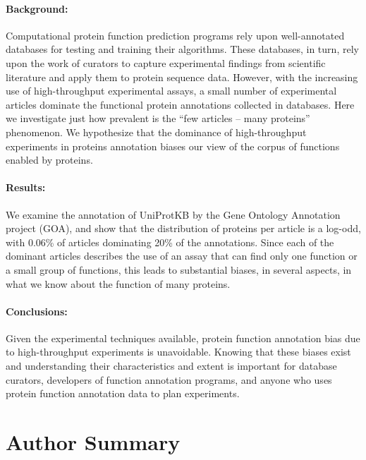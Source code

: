 \documentclass[12pt]{article}
\begin{document}
        \paragraph*{Background:} Computational protein function
prediction programs rely upon well-annotated databases for testing and training
their algorithms. These databases, in turn, rely upon the work of curators
to capture experimental findings from scientific literature and apply them to protein
sequence data. However, with the increasing use of high-throughput experimental
assays,  a small number of experimental articles dominate
the functional protein annotations collected in databases. 
Here we investigate just how prevalent is the ``few articles --
many proteins'' phenomenon. We hypothesize that the dominance of high-throughput experiments in
proteins annotation biases our view of the corpus of functions enabled by proteins.
      
        \paragraph*{Results:} We examine the annotation of
UniProtKB by the Gene Ontology Annotation project (GOA), and show that
the distribution of proteins per article is a log-odd, with 0.06\% of articles
dominating 20\% of the annotations. Since each of the dominant articles
describes the use of an assay that can find only one function or a small
group of functions, this leads to substantial biases, in several aspects, in what we know
about the function of many proteins.

        \paragraph*{Conclusions:} Given the experimental techniques
available, protein function annotation bias due to high-throughput experiments is unavoidable. Knowing
that these biases exist and understanding their characteristics and extent is important for
database curators, developers of function annotation programs, and
anyone who uses protein function annotation data to plan experiments.

\section*{Author Summary}
\end{document}
